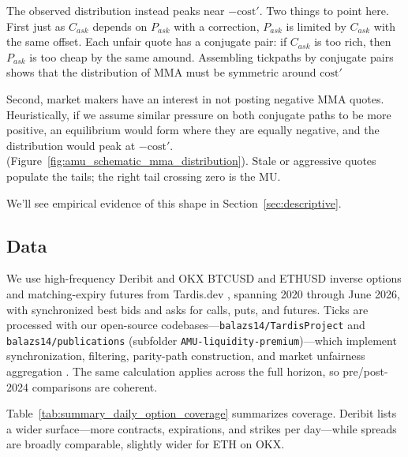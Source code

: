 \documentclass[12pt]{article}
\begin{document}
The observed distribution instead peaks near $-\mathrm{cost}'$. Two things to point here. First just as $C_{ask}$ depends on $P_{ask}$ with a correction, $P_{ask}$ is limited by $C_{ask}$ with the same offset. Each unfair quote has a conjugate pair: if $C_{ask}$ is too rich, then $P_{ask}$ is too cheap by the same amound. Assembling tickpaths by conjugate pairs shows that the distribution of MMA must be symmetric around $\mathrm{cost}'$ 

Second, market makers have an interest in not posting negative MMA quotes. Heuristically, if we assume similar pressure on both conjugate paths to be more positive, an equilibrium would form where they are equally negative, and the distribution would peak at $-\mathrm{cost}'$. (Figure~\ref{fig:amu_schematic_mma_distribution}). Stale or aggressive quotes populate the tails; the right tail crossing zero is the MU.

We'll see empirical evidence of this shape in Section~\ref{sec:descriptive}. 

\subsection{Data}

We use high-frequency Deribit and OKX BTCUSD and ETHUSD inverse options and matching-expiry futures from Tardis.dev \citep{tardis_main}, spanning 2020 through June 2026, with synchronized best bids and asks for calls, puts, and futures. Ticks are processed with our open-source codebases---\texttt{balazs14/TardisProject} and \texttt{balazs14/publications} (subfolder \texttt{AMU-liquidity-premium})---which implement synchronization, filtering, parity-path construction, and market unfairness aggregation \citep{kralik_tardisproject_repo, kralik_amu_publication_repo}. The same calculation applies across the full horizon, so pre/post-2024 comparisons are coherent.

\begin{table}[htbp]
    \centering
    {\renewcommand{\arraystretch}{1.3}\normalfont\normalsize}
    \caption{Summary statistics of matched put--call pairs in the 2020--2026 sample.}
    \label{tab:summary_daily_option_coverage}
\end{table}

Table~\ref{tab:summary_daily_option_coverage} summarizes coverage. Deribit lists a wider surface---more contracts, expirations, and strikes per day---while spreads are broadly comparable, slightly wider for ETH on OKX. 
\end{document}
